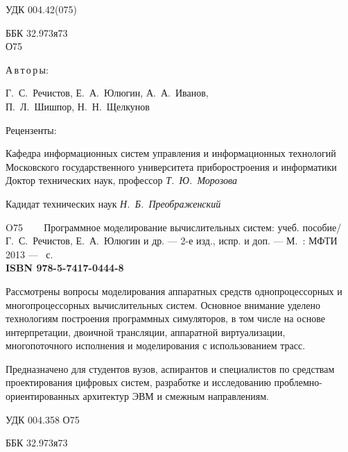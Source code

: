 \thispagestyle{empty}
\begingroup
\small
\begin{flushleft}
УДК 004.42(075)

ББК 32.973я73\\
\enskip \enskip \enskip \enskip \enskip О75    
\end{flushleft}
\begin{center}
\begin{normalsize}
\textsf{{А\,в\,т\,о\,р\,ы}:}
\end{normalsize}
Г.~С.~Речистов, Е.~А.~Юлюгин, А.~А.~Иванов, \\
П.~Л.~Шишпор, Н.~Н.~Щелкунов\\
\end {center}

\begin{center}
Рецензенты:

Кафедра информационных систем управления и информационных технологий Московского государственного университета приборостроения и информатики\\
Доктор технических наук, профессор \textit{Т.~Ю.~Морозова}

Кадидат технических наук \textit{Н.~Б.~Преображенский }

\end{center}

\noindent O75 ~~~ {Программное моделирование вычислительных систем}: учеб. пособие/ \\Г.~С.~Речистов, Е.~А.~Юлюгин и др. — 2-е изд., испр. и доп. — М.~: МФТИ 2013 — \pageref{page:lastpage}~с.\\
\textbf{ISBN 978-5-7417-0444-8}
\medskip

Рассмотрены вопросы моделирования аппаратных средств однопроцессорных и многопроцессорных вычислительных систем. Основное внимание уделено технологиям построения программных симуляторов, в том числе на основе интерпретации, двоичной трансляции, аппаратной виртуализации, многопоточного исполнения и моделирования с использованием трасс.

Предназначено для студентов вузов, аспирантов и специалистов по средствам проектирования цифровых систем, разработке и исследованию проблемно-ориентированных архитектур ЭВМ и смежным направлениям. 

{\raggedleft УДК 004.358 О75 \par}

{\raggedleft ББК 32.973я73 \par}
\vfill

